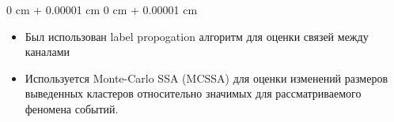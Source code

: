 \documentclass[10pt, letterpaper]{article}
\newenvironment{highlights}{
    \begin{itemize}[
        topsep=0.10 cm,
        parsep=0.10 cm,
        partopsep=0pt,
        itemsep=0pt,
        leftmargin=0 cm + 10pt
    ]
}{
    \end{itemize}
} %
\newenvironment{onecolentry}{
    \begin{adjustwidth}{
        0 cm + 0.00001 cm
    }{
        0 cm + 0.00001 cm
    }
}{
    \end{adjustwidth}
} %
\begin{document}
        \vspace{0.10 cm}
        \begin{onecolentry}
            \begin{highlights}
                \item Был использован label propogation алгоритм для оценки связей между каналами
                \item Используется Monte-Carlo SSA (MCSSA) для оценки изменений размеров выведенных кластеров относительно значимых для рассматриваемого феномена событий. 

            \end{highlights}
        \end{onecolentry}




    
\end{document}
